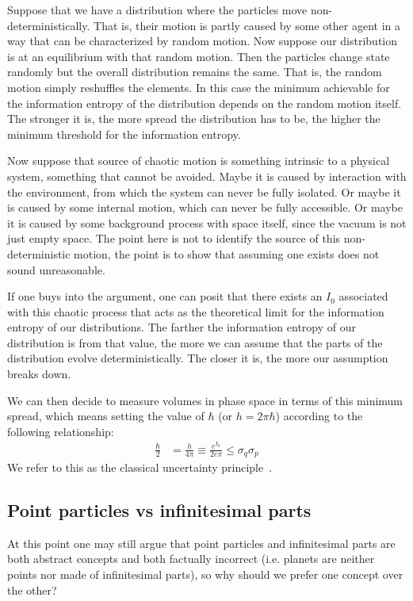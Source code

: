 \documentclass[11pt]{elsarticle}
\begin{document}
Suppose that we have a distribution where the particles move non-deterministically. That is, their motion is partly caused by some other agent in a way that can be characterized by random motion. Now suppose our distribution is at an equilibrium with that random motion. Then the particles change state randomly but the overall distribution remains the same. That is, the random motion simply reshuffles the elements. In this case the minimum achievable for the information entropy of the distribution depends on the random motion itself. The stronger it is, the more spread the distribution has to be, the higher the minimum threshold for the information entropy.

Now suppose that source of chaotic motion is something intrinsic to a physical system, something that cannot be avoided. Maybe it is caused by interaction with the environment, from which the system can never be fully isolated. Or maybe it is caused by some internal motion, which can never be fully accessible. Or maybe it is caused by some background process with space itself, since the vacuum is not just empty space. The point here is not to identify the source of this non-deterministic motion, the point is to show that assuming one exists does not sound unreasonable.

If one buys into the argument, one can posit that there exists an $I_0$ associated with this chaotic process that acts as the theoretical limit for the information entropy of our distributions. The farther the information entropy of our distribution is from that value, the more we can assume that the parts of the distribution evolve deterministically. The closer it is, the more our assumption breaks down.

We can then decide to measure volumes in phase space in terms of this minimum spread, which means setting the value of $\hbar$ (or $h = 2 \pi \hbar$) according to the following relationship:
\begin{align*}
\frac{\hbar}{2} &= \frac{h}{4\pi} \equiv  \frac{e^{I_0}}{2 e \pi} \leq \sigma_q\sigma_p
\end{align*}
 We refer to this as the classical uncertainty principle~\cite{AoPPhy1}.

\subsection*{Point particles vs infinitesimal parts}

At this point one may still argue that point particles and infinitesimal parts are both abstract concepts and both factually incorrect (i.e. planets are neither points nor made of infinitesimal parts), so why should we prefer one concept over the other?
\end{document}

